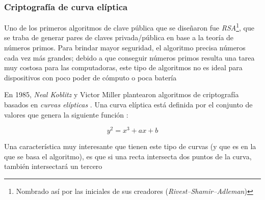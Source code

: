 \subsubsection*{Criptografía de curva elíptica}

Uno de los primeros algoritmos de clave pública que se diseñaron fue \emph{RSA}\footnote{Nombrado así por las iniciales de sus creadores (\emph{Rivest–Shamir–Adleman})}, que se traba de generar pares de claves privada/pública en base a la teoría de números primos. Para brindar mayor seguridad, el algoritmo precisa números cada vez más grandes; debido a que conseguir números primos resulta una tarea muy costosa para las computadoras, este tipo de algoritmos no es ideal para dispositivos con poco poder de cómputo o poca batería

En 1985, \emph{Neal Koblitz} y Victor Miller plantearon algoritmos de criptografía basados en \emph{curvas elípticas} \autocite{MediumECC}. Una curva elíptica está definida por el conjunto de valores que genera la siguiente función \autocite{CorbelliniECC}:

\[ y^2 = x^3 + ax + b\]

Una característica muy interesante que tienen este tipo de curvas (y que es en la que se basa el algoritmo), es que si una recta intersecta dos puntos de la curva, también intersectará un tercero

